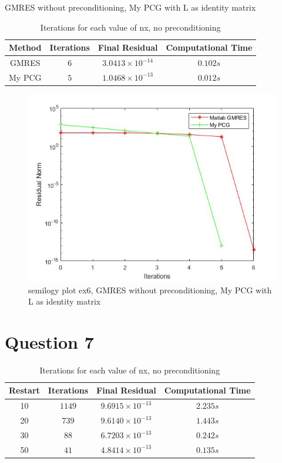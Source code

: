 \documentclass[a4paper, 11pt]{article}
\begin{document}
		GMRES without preconditioning, My PCG with L as identity matrix
			
		\begin{table}[H]
			\centering
			\begin{tabular}{c|c|c|c}
				\textbf{Method} &  \textbf{Iterations} 	& \textbf{Final Residual} 		& \textbf{Computational Time} 	\\ \hline
				GMRES			& 			$6$ 		& $ 3.0413 \times 10^{-14} $ 	& $ 0.102 s $	\\ \hline	
				My PCG 			& 			$5$			& $ 1.0468 \times 10^{-13} $	& $ 0.012 s $	\\ \hline
			\end{tabular}
			\caption{Iterations for each value of nx, no preconditioning}
			\label{table:ex4_c_NoPrec}
		\end{table}
	
		\begin{figure}[H]
			\centering
			\includegraphics[width=.6\linewidth]{ex6b.jpg}
			\caption{semilogy plot ex6, GMRES without preconditioning, My PCG with L as identity matrix}
			\label{fig:ex6_c_NoPrec}
		\end{figure}
		
		
		
		\section*{Question 7}
		
		\begin{table}[H]
			\centering
			\begin{tabular}{c|c|c|c}
				\textbf{Restart} &  \textbf{Iterations} 	& \textbf{Final Residual} 		& \textbf{Computational Time} 	\\ \hline
				10			& 			$1149$ 		& $ 9.6915 \times 10^{-13} $ 	& $ 2.235 s $	\\ \hline	
				20			& 			$739$		& $ 9.6140 \times 10^{-13} $	& $ 1.443 s $	\\ \hline
				30			& 			$88$ 		& $ 6.7203 \times 10^{-13} $ 	& $ 0.242 s $	\\ \hline	
				50			& 			$41$		& $ 4.8414 \times 10^{-13} $	& $ 0.135 s $	\\ \hline
			\end{tabular}
			\caption{Iterations for each value of nx, no preconditioning}
			\label{table:ex7}
		\end{table}
		
\end{document}
